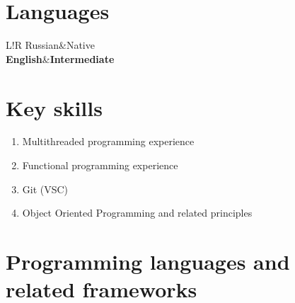 \documentclass[]{report}
\newcommand\VRule{\color{lightgray}\vrule width 0.5pt}
\begin{document}
\section*{\Large Languages}
\begin{tabular}{L!{\VRule}R}
Russian&Native\\
{\bf English}&{\bf Intermediate}
\end{tabular}


\section*{Key skills}

\begin{enumerate}

\item {{\large Multithreaded programming experience}}
\item {{\large Functional programming experience}}
\item {{\large Git (VSC)}}
\item {{\large Object Oriented Programming and related principles}}

\end{enumerate}

\section*{Programming languages and related frameworks}
\end{document}
